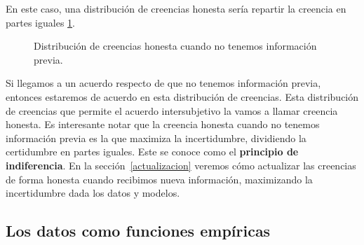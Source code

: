 \documentclass[a4paper,10pt]{book}
\begin{document}
%
En este caso, una distribución de creencias honesta sería repartir la creencia en partes iguales \ref{fig:distribucion_de_creencias_honesta}.
%
\begin{figure}[H]     
 \centering
{} 
\caption{Distribución de creencias honesta cuando no tenemos información previa.}
 \label{fig:distribucion_de_creencias_honesta}
\end{figure}
%
Si llegamos a un acuerdo respecto de que no tenemos información previa, entonces estaremos de acuerdo en esta distribución de creencias.
%
Esta distribución de creencias que permite el acuerdo intersubjetivo la vamos a llamar creencia honesta.
%
Es interesante notar que la creencia honesta cuando no tenemos información previa es la que maximiza la incertidumbre, dividiendo la certidumbre en partes iguales.
%
Este se conoce como el \textbf{principio de indiferencia}.
%
%
En la sección~\ref{actualizacion} veremos cómo actualizar las creencias de forma honesta cuando recibimos nueva información, maximizando la incertidumbre dada los datos y modelos.

\subsection{Los datos como funciones empíricas}
\end{document}

